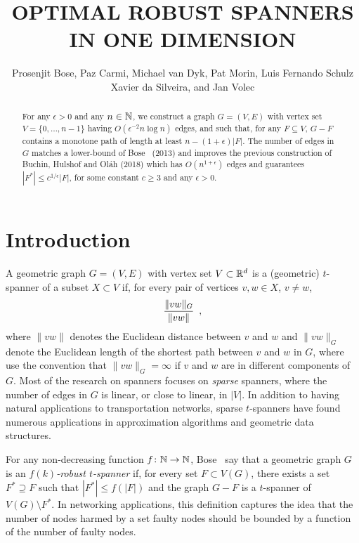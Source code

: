 \documentclass{patmorin}
\title{\MakeUppercase{Optimal Robust Spanners in One Dimension}}
\author{Prosenjit Bose, Paz Carmi, Michael van Dyk, Pat Morin, 
  \newline
  Luis Fernando Schulz Xavier da Silveira,
  and Jan Volec}
\begin{document}
\maketitle


\begin{abstract}
  For any $\epsilon >0$ and any $n\in\mathbb{N}$, we construct a graph $G=(V,E)$
  with vertex set $V=\{0,\ldots,n-1\}$ having $O(\epsilon^{-2}n\log n)$
  edges, and such that, for any $F\subseteq V$, $G-F$ contains a monotone
  path of length at least $n-(1+\epsilon)|F|$.  The number of edges
  in $G$ matches a lower-bound of Bose \etal\ (2013) and improves the
  previous construction of Buchin, Hulshof and Ol\'ah (2018) which has
  $O(n^{1+\epsilon})$ edges and guarantees $|F^*|\le c^{1/\epsilon}|F|$,
  for some constant $c\ge 3$ and any $\epsilon >0$.
\end{abstract}

\section{Introduction}

A geometric graph $G=(V,E)$ with vertex set $V\subset\mathbb{R}^d$ is a (geometric)
$t$-spanner of a subset $X\subset V$ if, for every pair of vertices
$v,w\in X$, $v\neq w$,
\begin{equation}
	\frac{\|vw\|_G}{\|vw\|} \enspace , \eqlabel{spanning-ratio}
\end{equation}
where $\|vw\|$ denotes the Euclidean distance between $v$ and $w$ and
$\|vw\|_G$ denote the Euclidean length of the shortest path between $v$
and $w$ in $G$, where use the convention that $\|vw\|_G=\infty$ if $v$
and $w$ are in different components of $G$.  
Most of the research on spanners focuses on \emph{sparse}
spanners, where the number of edges in $G$ is linear, or close to linear,
in $|V|$.  In addition to having natural applications to transportation
networks, sparse $t$-spanners have found numerous applications in
approximation algorithms and geometric data structures.

For any non-decreasing function $f\colon\mathbb{N}\to\mathbb{N}$, Bose \etal\ say
that a geometric graph $G$ is an \emph{$f(k)$-robust $t$-spanner}
if, for every set $F\subset V(G)$, there exists a set $F^*\supseteq
F$ such that $|F^*|\le f(|F|)$ and the graph $G-F$ is a $t$-spanner
of $V(G)\setminus F^*$.  In networking applications, this definition
captures the idea that the number of nodes harmed by a set faulty nodes
should be bounded by a function of the number of faulty nodes.
\end{document}
